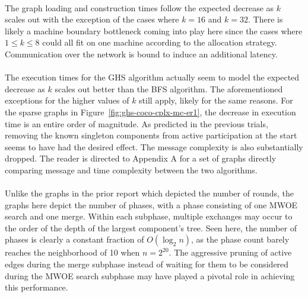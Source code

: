 \documentclass[11pt,epsf]{article}
\begin{document}
{{    \paragraph{}{
      The graph loading and construction times follow the expected decrease as $k$ scales out with the exception of the cases where
      $k = 16$ and $k = 32$. There is likely a machine boundary bottleneck coming into play here since the cases where $1 \leq k \leq 8$
      could all fit on one machine according to the allocation strategy. Communication over the network is bound to induce an additional latency.
    }
    \paragraph{}{
      The execution times for the GHS algorithm actually seem to model the expected decrease as $k$ scales out better than the
      BFS algorithm. The aforementioned exceptions for the higher values of $k$ still apply, likely for the same reasons.
      For the sparse graphs in Figure~\ref{fig:ghs-coco-cplx-mc-er1}, the decrease in execution time is an entire order
      of magnitude. As predicted in the previous trials\autocite[19]{bfs-coco}, removing the known singleton components from active participation
      at the start seems to have had the desired effect. The message complexity is also substantially dropped.
      The reader is directed to Appendix A for a set of graphs directly comparing message and time complexity between
      the two algorithms.
    }
    \paragraph{}{
      Unlike the graphs in the prior report\autocite[11-16]{bfs-coco} which depicted the number of rounds, the graphs here depict the number of
      phases, with a phase consisting of one MWOE search and one merge. Within each subphase, multiple exchanges
      may occur to the order of the depth of the largest component's tree. Seen here, the number of phases is
      clearly a constant fraction of $O(\log_2 n)$, as the phase count barely reaches the neighborhood of 10
      when $n = 2^{20}$. The aggressive pruning of active edges during the merge subphase instead of waiting
      for them to be considered during the MWOE search subphase may have played a pivotal role in achieving this performance.
    }
}}
\end{document}
